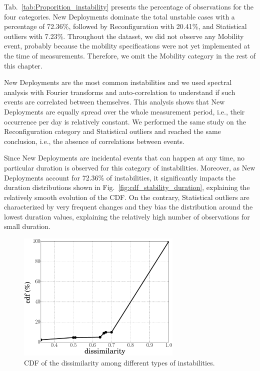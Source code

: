 Tab.~\ref{tab:Proporition_instability} presents the percentage of observations for the four categories. New Deployments dominate the total unstable cases with a percentage of 72.36\%, followed by Reconfiguration with 20.41\%, and Statistical outliers with 7.23\%. Throughout the dataset, we did not observe any Mobility event, probably because the mobility specifications were not yet implemented at the time of measurements. Therefore, we omit the Mobility category in the rest of this chapter.

New Deployments are the most common instabilities and we used spectral analysis with Fourier transforms and auto-correlation to understand if such events are correlated between themselves. This analysis shows that New Deployments are equally spread over the whole measurement period, i.e., their occurrence per day is relatively constant. We performed the same study on the Reconfiguration category and Statistical outliers and reached the same conclusion, i.e., the absence of correlations between events.

Since New Deployments are incidental events that can happen at any time, no particular duration is observed for this category of instabilities. Moreover, as New Deployments account for 72.36\% of instabilities, it significantly impacts the duration distributions shown in Fig.~\ref{fig:cdf_stability_duration}, explaining the relatively smooth evolution of the CDF. On the contrary, Statistical outliers are characterized by very frequent changes and they bias the distribution around the lowest duration values, explaining the relatively high number of observations for small duration.

\begin{figure}[!t]
	\centering
	\includegraphics[width=0.7\textwidth]{Pics/cdf_dissmilarity.eps}
	\caption{CDF of the dissimilarity among different types of instabilities.}
	\label{fig:cdf_dissmilarity}
\end{figure}

